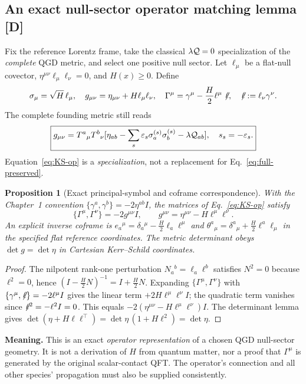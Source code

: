 \documentclass[11pt,a4paper]{article}
\newtheorem{proposition}{Proposition}[section]\newtheorem{lemma}[proposition]{Lemma}\newtheorem{definition}[proposition]{Definition}\newtheorem{remark}[proposition]{Remark}
\begin{document}
\subsection{An exact null-sector operator matching lemma [D]}
Fix the reference Lorentz frame, take the classical $\lambda\mathcal Q=0$ specialization of the \emph{complete} QGD metric, and select one positive null sector. Let $\ell_\mu$ be a flat-null covector, $\eta^{\mu\nu}\ell_\mu\ell_\nu=0$, and $H(x)\ge0$. Define
\begin{equation}\label{eq:KS-op}
 \sigma_\mu=\sqrt H\,\ell_\mu,\quad
 g_{\mu\nu}=\eta_{\mu\nu}+H\ell_\mu\ell_\nu,\quad
 \Gamma^\mu=\gamma^\mu-\frac H2\ell^\mu\not\!\ell,\quad
 \not\!\ell:=\ell_\nu\gamma^\nu.
\end{equation}
The complete founding metric still reads
\begin{equation}\label{eq:full-preserved}
 \boxed{g_{\mu\nu}=T^a{}_{\mu}T^b{}_{\nu}
 [\eta_{ab}-\sum_s\varepsilon_s\sigma_a^{(s)}\sigma_b^{(s)}-\lambda\mathcal Q_{ab}],\quad s_s=-\varepsilon_s.}
\end{equation}
Equation~\eqref{eq:KS-op} is a \emph{specialization}, not a replacement for Eq.~\eqref{eq:full-preserved}.

\begin{proposition}[Exact principal-symbol and coframe correspondence]\label{prop:F-KS}
With the Chapter~1 convention $\{\gamma^a,\gamma^b\}=-2\eta^{ab}I$, the matrices of Eq.~\eqref{eq:KS-op} satisfy
\begin{equation}\label{eq:cliffF}
 \boxed{\{\Gamma^\mu,\Gamma^\nu\}=-2g^{\mu\nu}I,
 \qquad g^{\mu\nu}=\eta^{\mu\nu}-H\ell^\mu\ell^\nu.}
\end{equation}
An explicit inverse coframe is $e_a{}^\mu=\delta_a{}^\mu-\tfrac H2\ell_a\ell^\mu$ and $\theta^a{}_{\mu}=\delta^a{}_{\mu}+\tfrac H2\ell^a\ell_\mu$ in the specified flat reference coordinates. The metric determinant obeys $\det g=\det\eta$ in Cartesian Kerr--Schild coordinates.
\end{proposition}
\begin{proof}
The nilpotent rank-one perturbation $N_a{}^b=\ell_a\ell^b$ satisfies $N^2=0$ because $\ell^2=0$, hence $(I-\tfrac H2N)^{-1}=I+\tfrac H2N$. Expanding $\{\Gamma^\mu,\Gamma^\nu\}$ with $\{\gamma^\mu,\not\!\ell\}=-2\ell^\mu I$ gives the linear term $+2H\ell^\mu\ell^\nu I$; the quadratic term vanishes since $\not\!\ell^2=-\ell^2 I=0$. This equals $-2(\eta^{\mu\nu}-H\ell^\mu\ell^\nu)I$. The determinant lemma gives $\det(\eta+H\ell\ell^\top)=\det\eta\,(1+H\ell^2)=\det\eta$.
\end{proof}
\textbf{Meaning.} This is an exact \emph{operator representation} of a chosen QGD null-sector geometry. It is not a derivation of $H$ from quantum matter, nor a proof that $\Gamma^\mu$ is generated by the original scalar-contact QFT. The operator's connection and all other species' propagation must also be supplied consistently.
\end{document}
